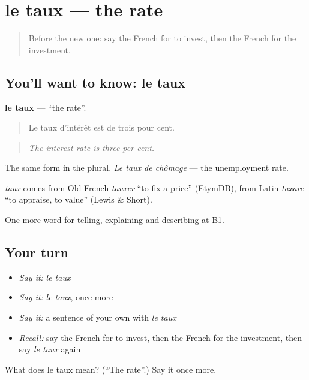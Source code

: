\section[le taux]{le taux — the rate}

\label{lesson:FR-C391-taux}



\begin{quote}
Before the new one: say the French for to invest, then the French for the investment.
\end{quote}

\subsection*{You'll want to know: le taux}
\textbf{le taux} — \textquotedblleft{}the rate\textquotedblright{}.

\begin{quote}
Le taux d'intérêt est de trois pour cent.
\end{quote}

\begin{quote}
\emph{The interest rate is three per cent.}
\end{quote}

The same form in the plural. \emph{Le taux de chômage} — the unemployment rate.

\begin{cousinweb}
\emph{taux} comes from Old French \emph{tauxer} \textquotedblleft{}to fix a price\textquotedblright{} (EtymDB), from Latin \emph{taxāre} \textquotedblleft{}to appraise, to value\textquotedblright{} (Lewis \& Short).
\end{cousinweb}

\begin{grammarlens}[title={What you've built}]
One more word for telling, explaining and describing at B1.
\end{grammarlens}

\subsection*{Your turn}
\begin{itemize}
\raggedright
  \item \emph{Say it:} \emph{le taux}
  \item \emph{Say it:} \emph{le taux}, once more
  \item \emph{Say it:} a sentence of your own with \emph{le taux}
  \item \emph{Recall:} say the French for to invest, then the French for the investment, then say \emph{le taux} again
\end{itemize}

\begin{tcolorbox}[breakable,colback=teal!4,colframe=teal!35!black,title={Before you move on}]
What does le taux mean? (\textquotedblleft{}The rate\textquotedblright{}.) Say it once more.
\end{tcolorbox}
